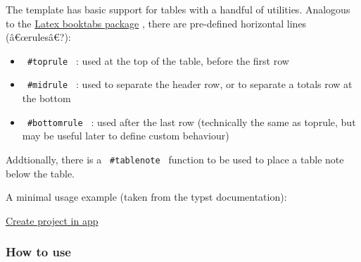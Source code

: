 The template has basic support for tables with a handful of utilities.
Analogous to the \href{https://ctan.org/pkg/booktabs}{Latex booktabs
package} , there are pre-defined horizontal lines (â€œrulesâ€?):

\begin{itemize}
\tightlist
\item
  \texttt{\ \#toprule\ } : used at the top of the table, before the
  first row
\item
  \texttt{\ \#midrule\ } : used to separate the header row, or to
  separate a totals row at the bottom
\item
  \texttt{\ \#bottomrule\ } : used after the last row (technically the
  same as toprule, but may be useful later to define custom behaviour)
\end{itemize}

Addtionally, there is a \texttt{\ \#tablenote\ } function to be used to
place a table note below the table.

A minimal usage example (taken from the typst documentation):

\begin{Shaded}
\begin{Highlighting}[]
\NormalTok{  [}
\NormalTok{      [2], [Eggs],}
\NormalTok{      [Pinch], [Salt],}
\NormalTok{    )}
\NormalTok{  ],}
\NormalTok{)}
\end{Highlighting}
\end{Shaded}

\href{/app?template=apa7-ish&version=0.2.0}{Create project in app}

\subsubsection{How to use}\label{how-to-use}

